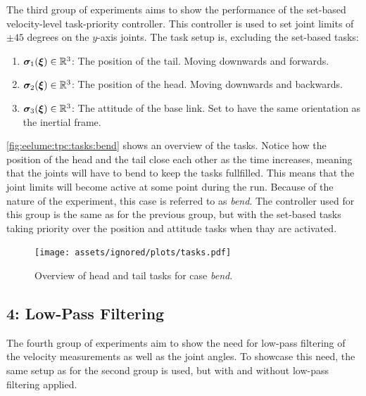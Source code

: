 The third group of experiments aims to show the performance of the set-based
velocity-level task-priority controller. This controller is used to set
joint limits of \(\pm 45\) degrees on the \(y\)-axis joints. The task setup is,
excluding the set-based tasks:
\begin{enumerate}
    \item \(\bm{\sigma}_1(\bm{\xi}) \in \mathbb{R}^3\): The position of the tail. Moving downwards and forwards.
    \item \(\bm{\sigma}_2(\bm{\xi}) \in \mathbb{R}^3\): The position of the head. Moving downwards and backwards.
    \item \(\bm{\sigma}_3(\bm{\xi}) \in \mathbb{R}^3\): The attitude of the base link. Set to have the same orientation as the inertial frame.
\end{enumerate}
\autoref{fig:eelume:tpc:tasks:bend} shows an overview of the tasks. Notice how
the position of the head and the tail close each other as the time increases, meaning
that the joints will have to bend to keep the tasks fullfilled. This means
that the joint limits will become active at some point during the run. Because
of the nature of the experiment, this case is referred to as \textit{bend}.
The controller
used for this group is the same as for the previous group, but with the set-based
tasks taking priority over the position and attitude tasks when thay are activated.

\begin{figure}[!ht]
    \centering
    \texttt{[image: assets/ignored/plots/tasks.pdf]}
    \caption{Overview of head and tail tasks for case \textit{bend}.}
    \label{fig:eelume:tpc:tasks:bend}
\end{figure}

\subsection*{4: Low-Pass Filtering}

The fourth group of experiments aim to show the need for low-pass filtering of the velocity measurements as well as the joint angles. To showcase this need, the same
setup as for the second group is used, but with and without low-pass filtering
applied. 








